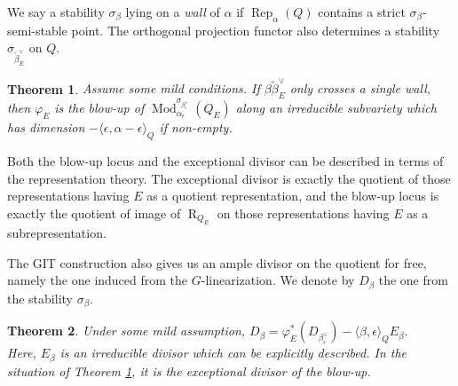 \documentclass{amsart}
\newtheorem{theorem}{Theorem}[section]
\theoremstyle{definition}
\theoremstyle{remark}
\numberwithin{equation}{section}
\begin{document}
We say a stability $\sigma_\beta$ lying on a {\em wall} of $\alpha$ if ${\operatorname{Rep}}_\alpha(Q)$ contains a strict $\sigma_\beta$-semi-stable point.
The orthogonal projection functor also determines a stability $\sigma_{\tilde{\beta}_E^\vee}$ on $Q$.

\begin{theorem} \label{T:intro2} Assume some mild conditions. If $\beta\tilde{\beta}_E^\vee$ only crosses a single wall, then
$\varphi_E$ is the blow-up of ${\operatorname{Mod}}_{\alpha_\epsilon}^{\sigma_{\beta_\epsilon^\vee}}(Q_E)$ along an irreducible subvariety which has dimension $-{\langle{\epsilon,\alpha-\epsilon}\rangle}_Q$ if non-empty. 
\end{theorem}

Both the blow-up locus and the exceptional divisor can be described in terms of the representation theory. The exceptional divisor is exactly the quotient of those representations having $E$ as a quotient representation, and the blow-up locus is exactly the quotient of image of ${\operatorname{R}}_{Q_E}$ on those representations having $E$ as a subrepresentation.

The GIT construction also gives us an ample divisor on the quotient for free, namely the one induced from the $G$-linearization. We denote by $D_\beta$ the one from the stability $\sigma_\beta$.

\begin{theorem} Under some mild assumption, $D_\beta=\varphi_E^*(D_{\beta_\epsilon^\vee})-{\langle{\beta,\epsilon}\rangle}_Q E_\beta.$\\
Here, $E_\beta$ is an irreducible divisor which can be explicitly described. In the situation of Theorem \ref{T:intro2}, it is the exceptional divisor of the blow-up.
\end{theorem}
\end{document}
